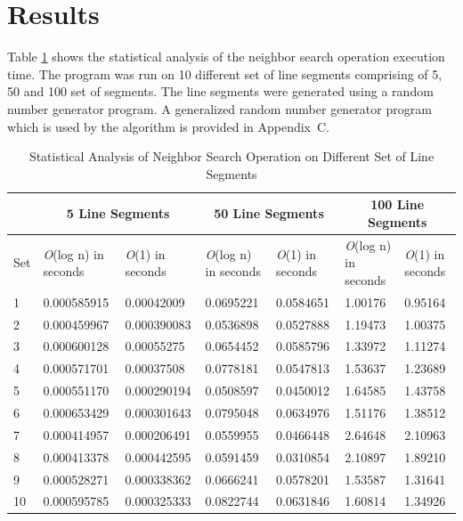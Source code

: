 \clearpage
\section{Results}
Table \ref{tab4} shows the statistical analysis of the neighbor search operation execution time. The program was run on 10 different set of line segments comprising of 5, 50 and 100 set of segments. The line segments were generated using a random number generator program. A generalized random number generator program which is used by the algorithm is provided in Appendix~C.
\begin{table}[hbt]
  \begin{minipage}{6.5in}
	\caption{Statistical Analysis of Neighbor Search Operation on Different Set of Line Segments \label{tab4}}
    \begin{tabular}{||p{1cm}|p{2.5cm}|p{2.5cm}|p{2cm}|p{2cm}|p{2cm}|p{2cm}||}    \hline
       & \multicolumn{2}{|c|}{5 Line Segments} & \multicolumn{2}{|c|}{50 Line Segments} & \multicolumn{2}{|c|}{100 Line Segments} \\ \hline \hline
	   Set & {\it O}(log n) in \newline seconds & {\it O}(1) in \newline seconds & {\it O}(log n) in \newline seconds & {\it O}(1) in \newline seconds & {\it O}(log n) in \newline seconds & {\it O}(1) in \newline seconds \\ \hline
		1 & 0.000585915 & 0.00042009 & 0.0695221 & 0.0584651 & 1.00176 & 0.95164 \\ \hline
		2 & 0.000459967 & 0.000390083 & 0.0536898 & 0.0527888 & 1.19473 & 1.00375 \\ \hline
		3 & 0.000600128 & 0.00055275 & 0.0654452 & 0.0585796 & 1.33972 & 1.11274 \\ \hline
		4 & 0.000571701 & 0.00037508 & 0.0778181 & 0.0547813 & 1.53637 & 1.23689 \\ \hline
		5 & 0.000551170 & 0.000290194 & 0.0508597 & 0.0450012 & 1.64585 & 1.43758 \\ \hline
		6 & 0.000653429 & 0.000301643 & 0.0795048 & 0.0634976 & 1.51176 & 1.38512 \\ \hline
		7 & 0.000414957 & 0.000206491 & 0.0559955 & 0.0466448 & 2.64648 & 2.10963 \\ \hline
		8 & 0.000413378 & 0.000442595 & 0.0591459 & 0.0310854 & 2.10897 & 1.89210 \\ \hline
		9 & 0.000528271 & 0.000338362 & 0.0666241 & 0.0578201 & 1.53587 & 1.31641 \\ \hline
		10 & 0.000595785 & 0.000325333 & 0.0822744 & 0.0631846 & 1.60814 & 1.34926 \\ \hline
    \end{tabular}
  \end{minipage}
\end{table}

